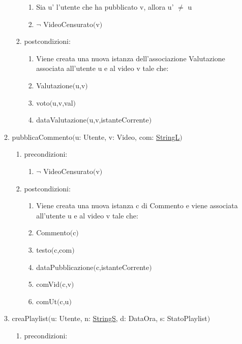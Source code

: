 \documentclass{article}
\begin{document}
\begin{enumerate}
\begin{enumerate}
\begin{enumerate}
\begin{enumerate}
                \item Sia u' l'utente che ha pubblicato v, allora u' $\neq$ u
                \item $\neg$ VideoCensurato$($v$)$
            \end{enumerate}
            \item postcondizioni:
            \begin{enumerate}
                \item Viene creata una nuova istanza dell'associazione Valutazione associata all'utente u e al video v tale che:
                \item Valutazione$($u,v$)$
                \item voto$($u,v,val$)$
                \item dataValutazione$($u,v,istanteCorrente$)$
            \end{enumerate}
        \end{enumerate}
        \newpage
        \item pubblicaCommento$($u: Utente, v: Video, com: \hyperref[sec:TipoStringL]{StringL}$)$
        \begin{enumerate}
            \item precondizioni:
            \begin{enumerate}
                \item $\neg$ VideoCensurato$($v$)$
            \end{enumerate}
            \item postcondizioni:
            \begin{enumerate}
                \item Viene creata una nuova istanza c di Commento e viene associata all'utente u e al video v tale che:
                \item Commento$($c$)$
                \item testo$($c,com$)$
                \item dataPubblicazione$($c,istanteCorrente$)$
                \item comVid$($c,v$)$
                \item comUt$($c,u$)$
            \end{enumerate}
        \end{enumerate}
        \newpage
        \item creaPlaylist$($u: Utente, n: \hyperref[sec:TipoStringS]{StringS}, d: DataOra, s: StatoPlaylist$)$
        \begin{enumerate}
            \item precondizioni:

\end{enumerate}
\end{enumerate}
\end{enumerate}
\end{document}
